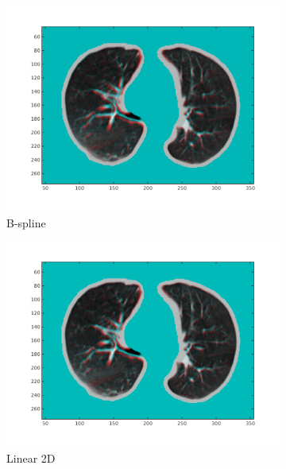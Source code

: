 \documentclass[11pt,a4paper,oneside]{report}
\begin{document}
\begin{figure}
\begin{subfigure}[b]{0.33\textwidth}
    \includegraphics[width=\textwidth, trim=0 50 0 0,clip=true]{figures/task4/visAss_m7.png}
    \caption{B-spline}
  \end{subfigure}%
  \begin{subfigure}[b]{0.33\textwidth}
    \includegraphics[width=\textwidth, trim=0 50 0 0,clip=true]{figures/task4/visAss_m8.png}
    \caption{Linear 2D}
  \end{subfigure}
  \begin{subfigure}[b]{0.33\textwidth}

\end{subfigure}
\end{figure}
\end{document}
